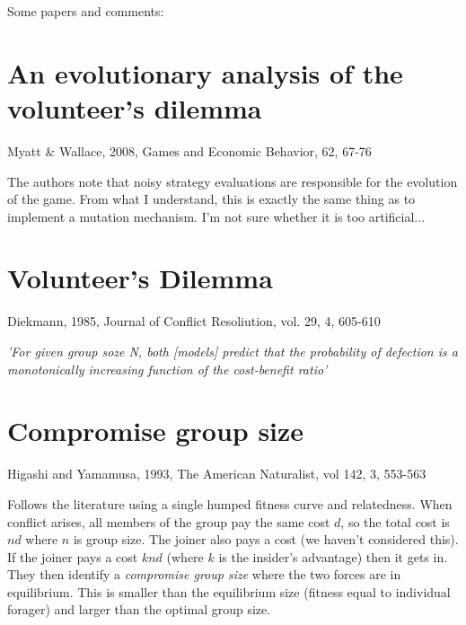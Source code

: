 \documentclass{article}
\begin{document}
Some papers and comments:

\section{An evolutionary analysis of the volunteer's dilemma}

Myatt \& Wallace, 2008, Games and Economic Behavior, 62, 67-76

The authors note that noisy strategy evaluations are responsible for the evolution of the game. From what I understand, this is exactly the same thing as to implement a mutation mechanism. I'm not sure whether it is too artificial...

\section{Volunteer's Dilemma}

Diekmann, 1985, Journal of Conflict Resoliution, vol. 29, 4, 605-610

\emph{'For given group soze N, both [models] predict that the probability of defection is a monotonically increasing function of the cost-benefit ratio'}


\section{Compromise group size}

Higashi and Yamamusa, 1993, The American Naturalist, vol 142, 3, 553-563

Follows the literature using a single humped fitness curve and relatedness. 
When conflict arises, all members of the group pay the same cost $d$, so the total cost is $nd$ where $n$ is group size.
The joiner also pays a cost (we haven't considered this). If the joiner pays a cost $knd$ (where $k$ is the insider's advantage) then it gets in.
They then identify a \emph{compromise group size} where the two forces are in equilibrium. This is smaller than the equilibrium size (fitness equal to individual forager)
and larger than the optimal group size.
\end{document}
